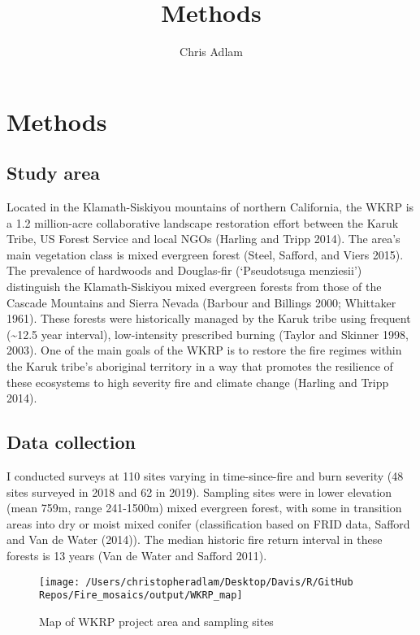 \documentclass[]{article}
\title{Methods}
\author{Chris Adlam}
\date{}
\begin{document}
\maketitle

\hypertarget{methods}{%
\section{Methods}\label{methods}}

\hypertarget{study-area}{%
\subsection{Study area}\label{study-area}}

Located in the Klamath-Siskiyou mountains of northern California, the
WKRP is a 1.2 million-acre collaborative landscape restoration effort
between the Karuk Tribe, US Forest Service and local NGOs (Harling and
Tripp 2014). The area's main vegetation class is mixed evergreen forest
(Steel, Safford, and Viers 2015). The prevalence of hardwoods and
Douglas-fir (`Pseudotsuga menziesii') distinguish the Klamath-Siskiyou
mixed evergreen forests from those of the Cascade Mountains and Sierra
Nevada (Barbour and Billings 2000; Whittaker 1961). These forests were
historically managed by the Karuk tribe using frequent
(\textasciitilde{}12.5 year interval), low-intensity prescribed burning
(Taylor and Skinner 1998, 2003). One of the main goals of the WKRP is to
restore the fire regimes within the Karuk tribe's aboriginal territory
in a way that promotes the resilience of these ecosystems to high
severity fire and climate change (Harling and Tripp 2014).

\hypertarget{data-collection}{%
\subsection{Data collection}\label{data-collection}}

I conducted surveys at 110 sites varying in time-since-fire and burn
severity (48 sites surveyed in 2018 and 62 in 2019). Sampling sites were
in lower elevation (mean 759m, range 241-1500m) mixed evergreen forest,
with some in transition areas into dry or moist mixed conifer
(classification based on FRID data, Safford and Van de Water (2014)).
The median historic fire return interval in these forests is 13 years
(Van de Water and Safford 2011).

\begin{wrapfigure}{R}{0.5\textwidth}

\hfill{}\texttt{[image: /Users/christopheradlam/Desktop/Davis/R/GitHub Repos/Fire\_mosaics/output/WKRP\_map]} 

\caption{Map of WKRP project area and sampling sites}\label{fig:unnamed-chunk-2}
\end{wrapfigure}
\end{document}

